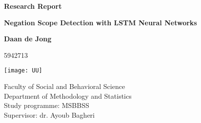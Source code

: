 \begin{titlepage}
	\begin{center}
		\vspace*{2cm}

		\Huge
		\textbf{Research Report}
		
		\Large
		\textbf{Negation Scope Detection with LSTM Neural Networks}
		
		\vspace{1.5cm}
		
		\textbf{Daan de Jong}
		
		5942713

		\texttt{[image: UU]}
			
		\vfill
					
		\large
		
		Faculty of Social and Behavioral Science\\
		Department of Methodology and Statistics\\
		Study programme: MSBBSS\\
		Supervisor: dr. Ayoub Bagheri\\
	
			
	\end{center}


\end{titlepage}